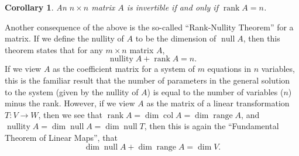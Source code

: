 \documentclass[letterpaper,12pt]{article}
\newtheorem{corollary}{Corollary}
\DeclareMathOperator{\nul}{null}
\DeclareMathOperator{\range}{range}
\DeclareMathOperator{\col}{col}
\DeclareMathOperator{\rank}{rank}
\begin{document}
\begin{corollary}
 An $n\times n$ matrix $A$ is invertible if and only if $\rank A=n$.
\end{corollary}
Another consequence of the above is the so-called ``Rank-Nullity Theorem'' for a matrix. If we define the nullity of $A$ to be the dimension of $\nul A$, then this theorem states that for any $m\times n$ matrix $A$,
\[
 \operatorname{nullity}A+\rank A = n.
\]
If we view $A$ as the coefficient matrix for a system of $m$ equations in $n$ variables, this is the familiar result that the number of parameters in the general solution to the system (given by the nullity of $A$) is equal to the number of variables ($n$) minus the rank. However, if we view $A$ as the matrix of a linear transformation $T:V\to W$, then we see that $\rank A = \dim \col A = \dim \range A$, and $\operatorname{nullity}A = \dim\nul A = \dim \nul T$, then this is again the ``Fundamental Theorem of Linear Maps'', that
\[
 \dim\nul A + \dim\range A = \dim V.
\]
\end{document}
